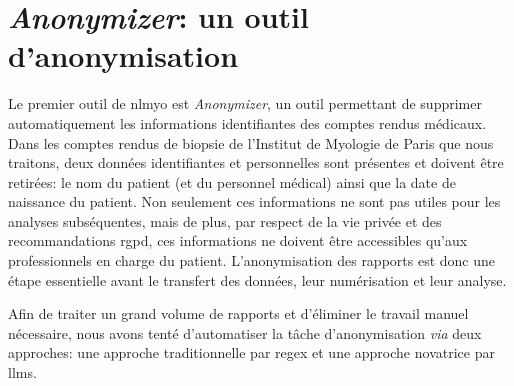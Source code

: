 \section{\textit{Anonymizer}: un outil d'anonymisation}
Le premier outil de \gls{nlmyo} est \textit{Anonymizer}, un outil permettant de supprimer automatiquement les informations identifiantes des comptes rendus médicaux. Dans les comptes rendus de biopsie de l'Institut de Myologie de Paris que nous traitons, deux données identifiantes et personnelles sont présentes et doivent être retirées: le nom du patient (et du personnel médical) ainsi que la date de naissance du patient. Non seulement ces informations ne sont pas utiles pour les analyses subséquentes, mais de plus, par respect de la vie privée et des recommandations \gls{rgpd}, ces informations ne doivent être accessibles qu'aux professionnels en charge du patient. L'anonymisation des rapports est donc une étape essentielle avant le transfert des données, leur numérisation et leur analyse.

Afin de traiter un grand volume de rapports et d'éliminer le travail manuel nécessaire, nous avons tenté d'automatiser la tâche d'anonymisation \textit{via} deux approches: une approche traditionnelle par \gls{regex} et une approche novatrice par \gls{llms}.

